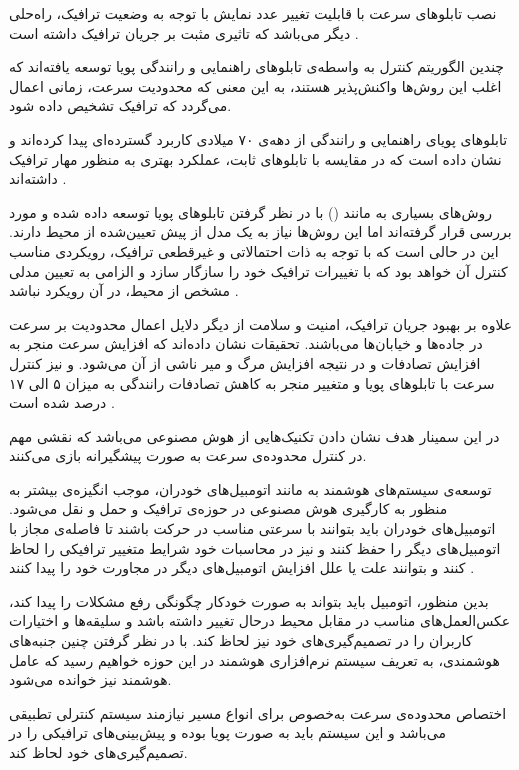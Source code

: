 نصب تابلوهای سرعت با قابلیت تغییر عدد نمایش با توجه به وضعیت ترافیک، راه‌حلی دیگر می‌باشد که تاثیری مثبت بر جریان ترافیک داشته است \cite{Papageorgiou2008}. 

چندین الگوریتم کنترل به واسطه‌ی تابلو‌های راهنمایی و رانندگی پویا توسعه یافته‌اند که اغلب این روش‌ها واکنش‌پذیر هستند، به این معنی که محدودیت سرعت، زمانی اعمال می‌گردد که ترافیک تشخیص داده شود.

تابلو‌های پویای راهنمایی و رانندگی از دهه‌ی ۷۰ میلادی کاربرد گسترده‌ای پیدا کرده‌اند و نشان داده است که در مقایسه با تابلوهای ثابت، عملکرد بهتری به منظور مهار ترافیک داشته‌اند \cite{Touhbi2017}.

روش‌های بسیاری به مانند () با در نظر گرفتن تابلوهای پویا توسعه داده شده و مورد بررسی قرار گرفته‌اند اما این روش‌ها نیاز به یک مدل از پیش تعیین‌شده از محیط دارند.
این در حالی است که با توجه به ذات احتمالاتی و غیرقطعی ترافیک، رویکردی مناسب کنترل آن خواهد بود که با تغییرات ترافیک خود را سازگار سازد و الزامی به تعیین مدلی مشخص از محیط، در آن رویکرد نباشد \cite{Touhbi2017}.

علاوه بر بهبود جریان ترافیک، امنیت و سلامت از دیگر دلایل اعمال محدودیت بر سرعت در جاده‌ها و خیابان‌ها می‌باشند.
تحقیقات نشان داده‌اند که افزایش سرعت منجر به افزایش تصادفات و در نتیجه افزایش مرگ و میر ناشی از آن می‌شود.
و نیز کنترل سرعت با تابلو‌های پویا و متغییر منجر به کاهش تصادفات رانندگی به میزان ۵ الی ۱۷ درصد شده است \cite{Zhu2014}.

در این سمینار هدف نشان دادن تکنیک‌هایی از هوش مصنوعی می‌باشد که نقشی مهم در کنترل محدوده‌ی سرعت به صورت پیشگیرانه بازی می‌کنند.

توسعه‌ی سیستم‌های هوشمند به مانند اتومبیل‌های خودران، موجب انگیزه‌ی بیشتر به منظور به کارگیری هوش مصنوعی در حوزه‌ی ترافیک و حمل و نقل می‌شود.
اتومبیل‌های خودران باید بتوانند با سرعتی مناسب در حرکت باشند تا فاصله‌ی مجاز با اتومبیل‌های دیگر را حفظ کنند و نیز در محاسبات خود شرایط متغییر ترافیکی را لحاظ کنند و بتوانند علت یا علل افزایش  اتومبیل‌های دیگر در مجاورت خود را پیدا کنند \cite{Walraven2016}.

بدین منظور، اتومبیل باید بتواند به صورت خودکار چگونگی رفع مشکلات را پیدا کند، عکس‌العمل‌های مناسب در مقابل محیط درحال تغییر داشته باشد و سلیقه‌ها و اختیارات کاربران را در تصمیم‌گیری‌های خود نیز لحاظ کند.
با در نظر گرفتن چنین جنبه‌های هوشمندی، به تعریف سیستم نرم‌افزاری هوشمند در این حوزه خواهیم رسید که عامل هوشمند نیز خوانده می‌شود. 

اختصاص محدوده‌ی سرعت به‌خصوص برای انواع مسیر نیازمند سیستم کنترلی تطبیقی می‌باشد و این سیستم باید به صورت پویا بوده و پیش‌بینی‌های ترافیکی را در تصمیم‌گیری‌های خود لحاظ کند.

